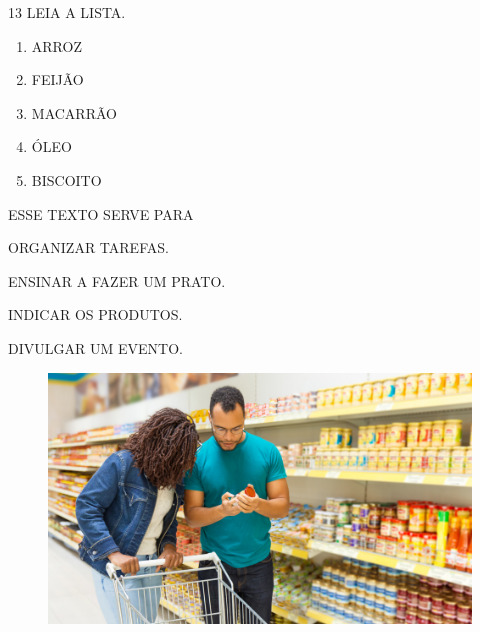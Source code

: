 \pagebreak

\num{13} LEIA A LISTA.

\begin{myquote}
\begin{enumerate}
\item ARROZ

\item FEIJÃO

\item MACARRÃO

\item ÓLEO

\item BISCOITO



\end{enumerate}
\end{myquote}

ESSE TEXTO SERVE PARA

\begin{escolha}
\item ORGANIZAR TAREFAS.

\item ENSINAR A FAZER UM PRATO.

\item INDICAR OS PRODUTOS.

\item DIVULGAR UM EVENTO.
\end{escolha}

\begin{figure}[H]
\centering
\includegraphics[width=\textwidth]{media/image273.png}
\end{figure}


